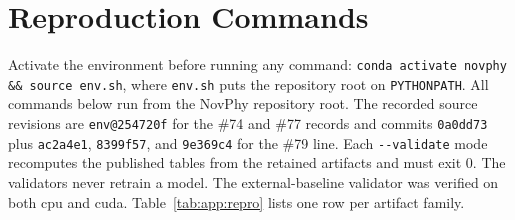 \section{Reproduction Commands}
\label{sec:app:repro}

Activate the environment before running any command: \texttt{conda activate novphy \&\& source env.sh}, where \texttt{env.sh} puts the repository root on \texttt{PYTHONPATH}. All commands below run from the NovPhy repository root. The recorded source revisions are \texttt{env@254720f} for the \#74 and \#77 records and commits \texttt{0a0dd73} plus \texttt{ac2a4e1}, \texttt{8399f57}, and \texttt{9e369c4} for the \#79 line. Each \texttt{-{}-validate} mode recomputes the published tables from the retained artifacts and must exit 0. The validators never retrain a model. The external-baseline validator was verified on both cpu and cuda. Table~\ref{tab:app:repro} lists one row per artifact family.

